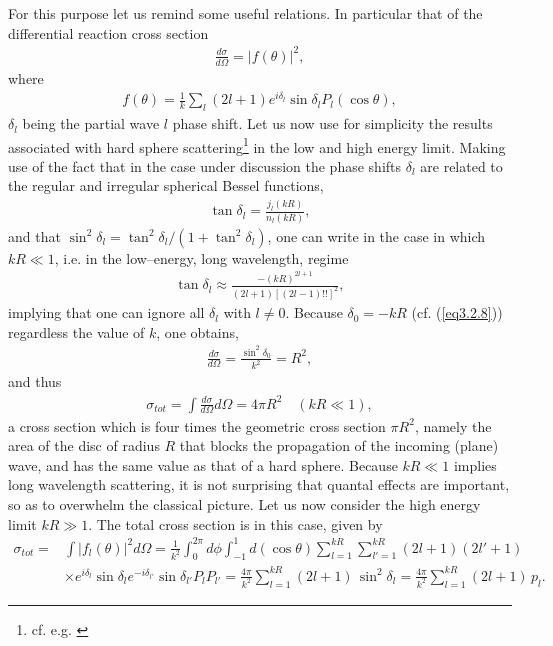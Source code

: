 For this purpose let us remind some useful relations. In particular that of the differential reaction cross section 
\begin{align}
\frac{d\sigma}{d\Omega}=|f(\theta)|^2,
\end{align}
where
\begin{align}
f(\theta)=\frac{1}{k}\sum_l(2l+1)e^{i\delta_l}\sin\delta_lP_l(\cos\theta),
\end{align}
$\delta_l$ being the partial wave $l$ phase shift. Let us now use for simplicity the results associated with hard sphere scattering\footnote{cf. e.g. \cite{Sakurai:94}} in the low and high energy limit. Making use of the fact that in the case under discussion the phase shifts $\delta_l$ are related to the regular and irregular spherical Bessel functions,
\begin{align}\label{eq3.2.8}
\tan\delta_l=\frac{j_l(kR)}{n_l(kR)},
\end{align}
and that $\sin^2\delta_l=\tan^2\delta_l/(1+\tan^2\delta_l)$,  one can write in the case in which $kR\ll1$, i.e. in the low--energy, long wavelength, regime
\begin{align}
\tan\delta_l\approx\frac{-(kR)^{2l+1}}{(2l+1)[(2l-1)!!]^2},
\end{align}
implying that one can ignore all $\delta_l$ with $l\neq0$. Because $\delta_0=-kR$ (cf. (\ref{eq3.2.8})) regardless the value of $k$, one obtains,
\begin{align}
\frac{d\sigma}{d\Omega}=\frac{\sin^2\delta_0}{k^2}=R^2,
\end{align}
and thus
\begin{align}
\sigma_{tot}=\int\frac{d\sigma}{d\Omega}d\Omega=4\pi R^2\quad(kR\ll1),
\end{align}
a cross section which is four times the geometric cross section $\pi R^2$, namely the area of the disc of radius $R$ that blocks the propagation of the incoming (plane) wave, and has the same value as that of a hard sphere. Because $kR\ll1$  
implies long wavelength scattering, it is not surprising that quantal effects are important, so as to overwhelm the classical picture. Let us now consider the high energy limit $kR\gg 1$. The total cross section is in this case, given by
\begin{align}\label{eq3.2.6}
\nonumber\sigma_{tot}=&\int |f_l(\theta)|^2d\Omega=\frac{1}{k^2}\int_0^{2\pi}d\phi\int_{-1}^{1}d(\cos\theta)\sum_{l=1}^{kR}\sum_{l'=1}^{kR}(2l+1)(2l'+1)\\
&\times e^{i\delta_l}\sin\delta_l e^{-i\delta_{l'}}\sin\delta_{l'}P_lP_{l'}=\frac{4\pi}{k^2}\sum_{l=1}^{kR}(2l+1)\,\sin^2\delta_l=\frac{4\pi}{k^2}\sum_{l=1}^{kR}(2l+1)\,p_l.
\end{align}
